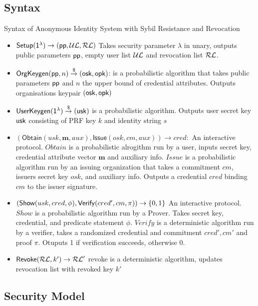 \newpage
\subsection{Syntax}
Syntax of Anonymous Identity System with Sybil Resistance and Revocation
\begin{itemize}
    \item $\mathsf{Setup}(\mathsf{1^{\lambda}}) \to (\mathsf{pp}, \mathcal{UL}, \mathcal{RL})$ Takes security parameter $\lambda$ in unary, outputs public parameters $\mathsf{pp}$, empty user list $\mathcal{UL}$ and revocation list $\mathcal{RL}$.

    \item $\mathsf{OrgKeygen}(\mathsf{pp}, n) \stackrel{\$}{\to} (\mathsf{osk}, \mathsf{opk})$: is a probabilistic algorithm that takes public parameters $\mathsf{pp}$ and $n$ the upper bound of credential attributes. Outputs organisations keypair $(\mathsf{osk}, \mathsf{opk})$

    \item $\mathsf{UserKeygen}(\mathsf{1^{\lambda}}) \stackrel{\$}{\to} (\mathsf{usk})$ is a probabilistic algorithm. Outputs user secret key $\mathsf{usk}$ consisting of PRF key $k$ and identity string $s$

    \item $(\mathsf{Obtain}(usk, \textbf{m}, aux), \mathsf{Issue}(osk, cm, aux)) \to cred:$ An interactive protocol. $Obtain$ is a probabilistic alrogithm run by a user, inputs secret key, credential attribute vector $\textbf{m}$ and auxiliary info. $Issue$ is a probabilistic algorithm run by an issuing organization that takes a commitment $cm$, issuers secret key $osk$, and auxiliary info. Outputs a credential $cred$ binding $cm$ to the issuer signature.

    \item $(\mathsf{Show}(usk, cred, \phi), \mathsf{Verify}(cred', cm, \pi)) \to \{0,1\}$ An interactive protocol. $Show$ is a probabilistic algorithm run by a Prover. Takes secret key, credential, and predicate statement $\phi$. $Verify$ is a deterministic algorithm run by a verifier, takes a randomized credential and commitment $cred', cm'$ and proof $\pi$. Otuputs 1 if verification succeeds, otherwise 0.

    \item $\mathsf{Revoke}(\mathcal{RL}, k') \to \mathcal{RL}'$ revoke is a deterministic algorithm, updates revocation list with revoked key $k'$
\end{itemize}


\subsection{Security Model}

